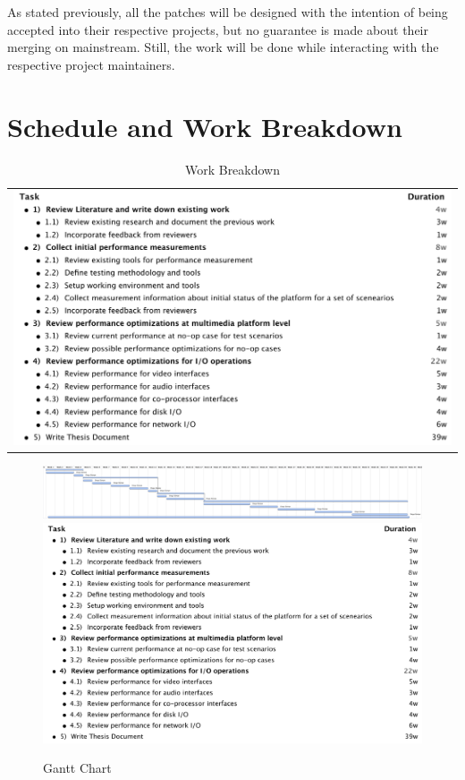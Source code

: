 As stated previously, all the patches will be designed with the intention of being accepted into their respective projects, but no guarantee is made about their merging on mainstream. Still, the work will be done while interacting with the respective project maintainers.

\section{Schedule and Work Breakdown}

\begin{table}[tph]
\caption{Work Breakdown} \centering
\begin{tabular}{c}
\includegraphics[width=1.0\textwidth]{images/Outline.pdf}
\end{tabular}
\end{table}

\begin{figure}[tbh]
\centering
\includegraphics[width=0.55\textheight,height=0.34\textwidth,angle=90]{images/Gantt.pdf}\\
\includegraphics[width=0.4\textheight,angle=90]{images/Outline.pdf}
\caption{Gantt Chart}\label{gantt}
\end{figure}
